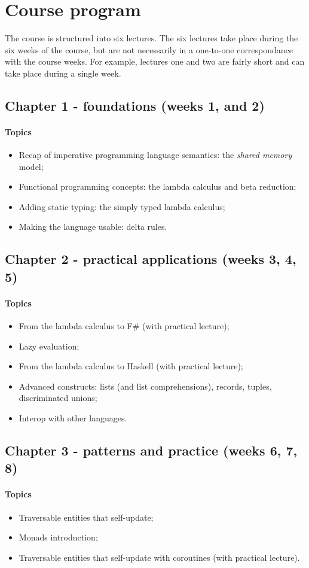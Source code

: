 \section{Course program}
The course is structured into six lectures.
The six lectures take place during the six weeks of the course, but are not necessarily in a one-to-one correspondance with the course weeks. For example, lectures one and two are fairly short and can take place during a single week.

\subsection{Chapter 1 - foundations (weeks 1, and 2)}
\paragraph*{Topics}
\begin{itemize}
	\item Recap of imperative programming language semantics: the \textit{shared memory} model;
	\item Functional programming concepts: the lambda calculus and beta reduction;
	\item Adding static typing: the simply typed lambda calculus;
	\item Making the language usable: delta rules.
\end{itemize}

\subsection{Chapter 2 - practical applications (weeks 3, 4, 5)}
\paragraph*{Topics}			
\begin{itemize}
	\item From the lambda calculus to F\# (with practical lecture);
	\item Lazy evaluation;
	\item From the lambda calculus to Haskell (with practical lecture);
	\item Advanced constructs: lists (and list comprehensions), records, tuples, discriminated unions;
	\item Interop with other languages.
\end{itemize}

\subsection{Chapter 3 - patterns and practice (weeks 6, 7, 8)}
\paragraph*{Topics}			
\begin{itemize}
	\item Traversable entities that self-update;
	\item Monads introduction;
	\item Traversable entities that self-update with coroutines (with practical lecture).
\end{itemize}
